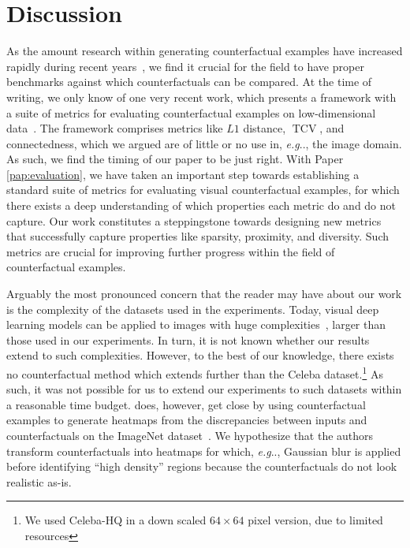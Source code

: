 \documentclass[11pt,a4paper,twoside,openright,final]{memoir}
\makeatletter
\DeclareRobustCommand\onedot{\futurelet\@let@token\@onedot}
\def\@onedot{\ifx\@let@token.\else.\null\fi\xspace}
\def\eg{\emph{e.g}\onedot} \def\Eg{\emph{E.g}\onedot}
\newcommand*{\paperref}[1]{Paper \hyperref[#1]{\ref{#1}}}
\makeatother
\begin{document}
\section{Discussion}\label{sec:eval-discussion}
As the amount research within generating counterfactual examples have increased rapidly during recent years~\cite{Stepin2021}, we find it crucial for the field to have proper benchmarks against which counterfactuals can be compared.
At the time of writing, we only know of one very recent work, which presents a framework with a suite of metrics for evaluating counterfactual examples on low-dimensional data~\cite{clara}. 
The framework comprises metrics like $L1$ distance, $\operatorname{TCV}$, and connectedness, which we argued are of little or no use in, \eg, the image domain.
As such, we find the timing of our paper to be just right. 
With \paperref{pap:evaluation}, we have taken an important step towards establishing a standard suite of metrics for evaluating visual counterfactual examples, for which there exists a deep understanding of which properties each metric do and do not capture.
Our work constitutes a steppingstone towards designing new metrics that successfully capture properties like sparsity, proximity, and diversity.
Such metrics are crucial for improving further progress within the field of counterfactual examples.

Arguably the most pronounced concern that the reader may have about our work is the complexity of the datasets used in the experiments. 
Today, visual deep learning models can be applied to images with huge complexities~\cite{biggan, vit}, larger than those used in our experiments.
In turn, it is not known whether our results extend to such complexities.
However, to the best of our knowledge, there exists no counterfactual method which extends further than the Celeba dataset.\footnote{We used Celeba-HQ in a down scaled $64\times 64$ pixel version, due to limited resources}
As such, it was not possible for us to extend our experiments to such datasets within a reasonable time budget. 
\citet{Elliott_2021_CVPR} does, however, get close by using counterfactual examples to generate heatmaps from the discrepancies between inputs and counterfactuals on the ImageNet dataset~\cite{imagenet}. 
We hypothesize that the authors transform counterfactuals into heatmaps for which, \eg, Gaussian blur is applied before identifying ``high density'' regions because the counterfactuals do not look realistic as-is.
\end{document}
